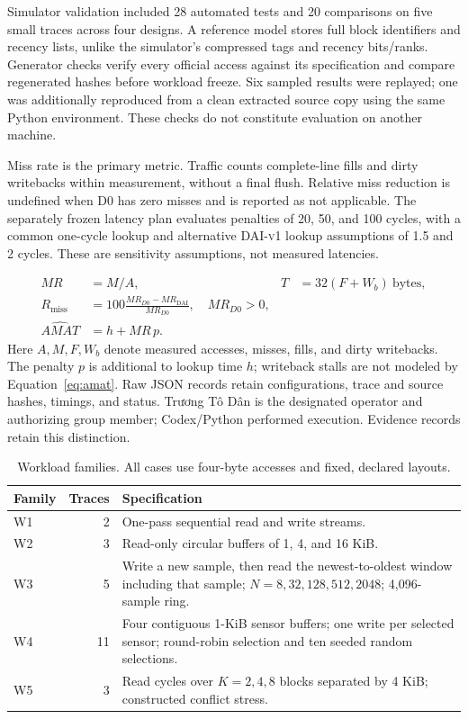 \documentclass[11pt,a4paper]{article}
\newcommand{\dai}{\textsc{DAI-v1}}
\begin{document}
Simulator validation included 28 automated tests and 20 comparisons on five small traces across four designs. A reference model stores full block identifiers and recency lists, unlike the simulator's compressed tags and recency bits/ranks. Generator checks verify every official access against its specification and compare regenerated hashes before workload freeze. Six sampled results were replayed; one was additionally reproduced from a clean extracted source copy using the same Python environment. These checks do not constitute evaluation on another machine.

Miss rate is the primary metric. Traffic counts complete-line fills and dirty writebacks within measurement, without a final flush. Relative miss reduction is undefined when D0 has zero misses and is reported as not applicable. The separately frozen latency plan evaluates penalties of 20, 50, and 100 cycles, with a common one-cycle lookup and alternative \dai{} lookup assumptions of 1.5 and 2 cycles. These are sensitivity assumptions, not measured latencies.

\begin{align}
MR &= M/A, & T &= 32(F+W_b)\ \text{bytes},\label{eq:metrics}\\
R_{\mathrm{miss}} &= 100\frac{MR_{D0}-MR_{\mathrm{DAI}}}{MR_{D0}},\quad MR_{D0}>0,\label{eq:reduction}\\
\widehat{AMAT} &= h + MR\,p.\label{eq:amat}
\end{align}
Here $A,M,F,W_b$ denote measured accesses, misses, fills, and dirty writebacks. The penalty $p$ is additional to lookup time $h$; writeback stalls are not modeled by Equation~\ref{eq:amat}. Raw JSON records retain configurations, trace and source hashes, timings, and status. Trương Tô Dân is the designated operator and authorizing group member; Codex/Python performed execution. Evidence records retain this distinction.

\begin{table}[htbp]\centering\small
\caption{Workload families. All cases use four-byte accesses and fixed, declared layouts.}\label{tab:workloads}
\begin{tabularx}{\linewidth}{l r Y}\toprule
Family & Traces & Specification\\\midrule
W1 & 2 & One-pass sequential read and write streams.\\
W2 & 3 & Read-only circular buffers of 1, 4, and 16 KiB.\\
W3 & 5 & Write a new sample, then read the newest-to-oldest window including that sample; $N=8,32,128,512,2048$; 4,096-sample ring.\\
W4 & 11 & Four contiguous 1-KiB sensor buffers; one write per selected sensor; round-robin selection and ten seeded random selections.\\
W5 & 3 & Read cycles over $K=2,4,8$ blocks separated by 4 KiB; constructed conflict stress.\\\bottomrule
\end{tabularx}
\end{table}
\end{document}
